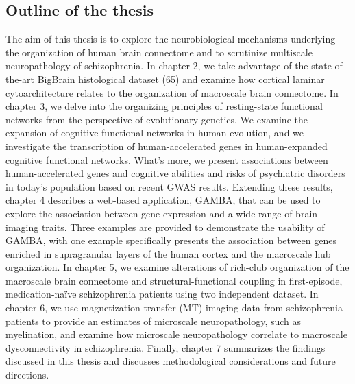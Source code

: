 \begin{refsection}
\section*{Outline of the thesis}
The aim of this thesis is to explore the neurobiological mechanisms underlying the organization of human brain connectome and to scrutinize multiscale neuropathology of schizophrenia. In chapter 2, we take advantage of the state-of-the-art BigBrain histological dataset (65) and examine how cortical laminar cytoarchitecture relates to the organization of macroscale brain connectome. In chapter 3, we delve into the organizing principles of resting-state functional networks from the perspective of evolutionary genetics. We examine the expansion of cognitive functional networks in human evolution, and we investigate the transcription of human-accelerated genes in human-expanded cognitive functional networks. What’s more, we present associations between human-accelerated genes and cognitive abilities and risks of psychiatric disorders in today’s population based on recent GWAS results. Extending these results, chapter 4 describes a web-based application, GAMBA, that can be used to explore the association between gene expression and a wide range of brain imaging traits. Three examples are provided to demonstrate the usability of GAMBA, with one example specifically presents the association between genes enriched in supragranular layers of the human cortex and the macroscale hub organization. In chapter 5, we examine alterations of rich-club organization of the macroscale brain connectome and structural-functional coupling in first-episode, medication-naïve schizophrenia patients using two independent dataset. In chapter 6, we use magnetization transfer (MT) imaging data from schizophrenia patients to provide an estimates of microscale neuropathology, such as myelination, and examine how microscale neuropathology correlate to macroscale dysconnectivity in schizophrenia. Finally, chapter 7 summarizes the findings discussed in this thesis and discusses methodological considerations and future directions.

\end{refsection}